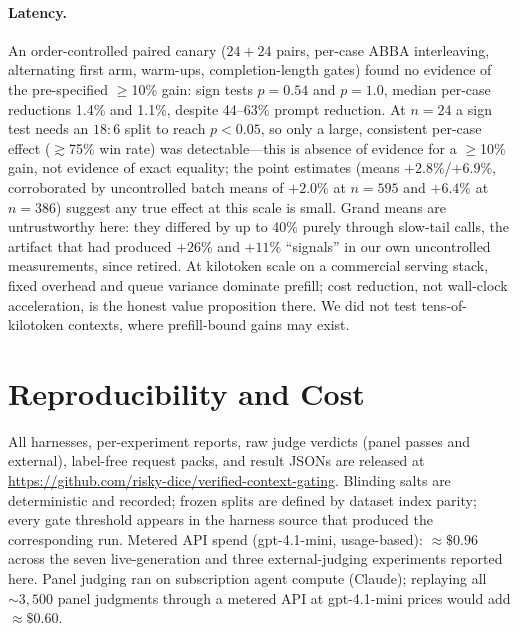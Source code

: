 \documentclass[11pt]{article}
\begin{document}
\paragraph{Latency.} An order-controlled paired canary ($24{+}24$ pairs,
per-case ABBA interleaving, alternating first arm, warm-ups,
completion-length gates) found no evidence of the pre-specified
$\ge$10\% gain: sign tests $p=0.54$ and $p=1.0$, median per-case
reductions 1.4\% and 1.1\%, despite 44--63\% prompt reduction. At $n{=}24$
a sign test needs an $18{:}6$ split to reach $p<0.05$, so only a large,
consistent per-case effect ($\gtrsim$75\% win rate) was detectable---this
is absence of evidence for a $\ge$10\% gain, not evidence of exact
equality; the
point estimates (means $+2.8\%$/$+6.9\%$, corroborated by uncontrolled
batch means of $+2.0\%$ at $n{=}595$ and $+6.4\%$ at $n{=}386$) suggest
any true effect at this scale is small. Grand means are untrustworthy
here: they differed by up to 40\% purely through slow-tail calls, the
artifact that had produced $+26\%$ and $+11\%$ ``signals'' in our own
uncontrolled measurements, since retired. At kilotoken scale on a
commercial serving stack, fixed overhead and queue variance dominate
prefill; cost reduction, not wall-clock acceleration, is the honest value
proposition there. We did not test tens-of-kilotoken contexts, where
prefill-bound gains may exist.

\section{Reproducibility and Cost}
\label{sec:repro}

All harnesses, per-experiment reports, raw judge verdicts (panel passes
and external), label-free request packs, and result JSONs are released at
\url{https://github.com/risky-dice/verified-context-gating}. Blinding
salts are deterministic and recorded; frozen splits are defined by dataset
index parity; every gate threshold appears in the harness source that
produced the corresponding run. Metered API spend (gpt-4.1-mini,
usage-based): ${\approx}\$0.96$ across the seven live-generation and three
external-judging experiments reported here. Panel judging ran on
subscription agent compute (Claude); replaying all ${\sim}3{,}500$ panel
judgments through a metered API at gpt-4.1-mini prices would add
${\approx}\$0.60$.
\end{document}
